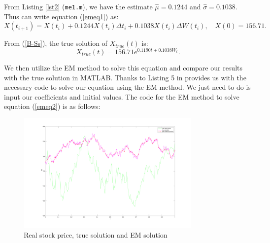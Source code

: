 \documentclass[12pt,a4paper]{article}
\theoremstyle{definition}
\begin{document}
From Listing \ref{lst2} (\verb|me1.m|), we have the estimate $\hat{\mu}=0.1244$ and $\hat{\sigma}=0.1038$. Thus can write equation (\ref{emeq1}) as:\begin{equation}\label{emeq2}
    X(t_{i+1})=X(t_i)+0.1244 X(t_i)\Delta t_i+0.1038 X(t_i) \Delta W(t_i),\quad X(0)=156.71.
\end{equation}




From (\ref{B-Ss}), the true solution of $X_{true}(t)$ is:
\begin{equation}
    \label{trueAAPL} X_{true}(t)= 156.71 e^{0.1190t+0.1038W_t}.
\end{equation}

We then utilize the EM method to solve this equation and compare our results with the true solution in MATLAB. Thanks to Listing 5 in \cite{higham._2001} provides us with the necessary code to solve our equation using the EM method. We just need to do is input our coefficients and initial values. The code for the EM method to solve equation (\ref{emeq2}) is as follows:


\begin{figure}[htbp]
\centering
\includegraphics[width=0.8\textwidth]{fig/fig3.png}
\caption{\label{em1plot}Real stock price, true solution and EM solution}
\end{figure}
\end{document}

